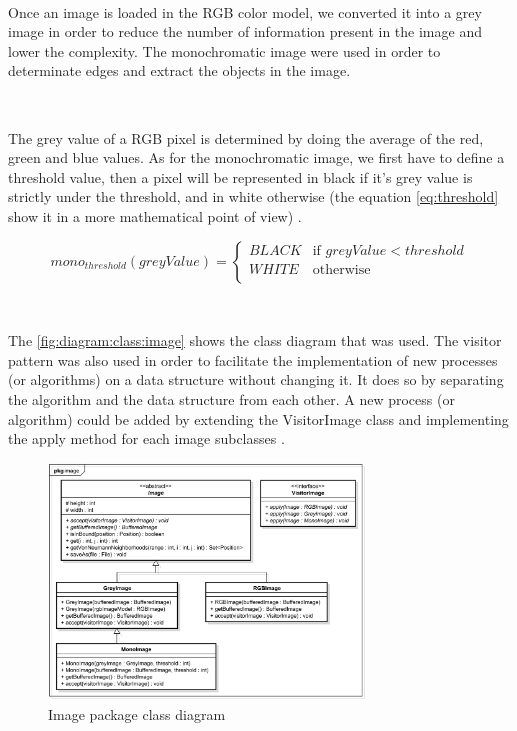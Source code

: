 ~~

Once an image is loaded in the RGB color model, we converted it into a grey image in order to reduce the number of information present in the image and lower the complexity. The monochromatic image were used in order to determinate edges and extract the objects in the image.

~~

The grey value of a RGB pixel is determined by doing the average of the red, green and blue values. As for the monochromatic image, we first have to define a 
threshold value, then a pixel will be represented in black if it's grey value is strictly under the threshold, and in white otherwise (the equation \ref{eq:threshold} show it in a more mathematical point of view) \cite{bib:image:Threshold}.

\begin{equation} \label{eq:threshold}
mono_{threshold}(greyValue) = 
	\begin{cases}
		BLACK & \text{if } greyValue < threshold \\
		WHITE & \text{otherwise} \\ 
	\end{cases}
\end{equation}


~~

The \vref{fig:diagram:class:image} shows the class diagram that was used. The visitor pattern was also used in order to facilitate the implementation of new processes (or algorithms) on a data structure without changing it. It does so by separating the algorithm and the data structure from each other. A new process (or algorithm) could be added by extending the VisitorImage class and implementing the apply method for each image subclasses \cite{bib:pattern:Visitor}. 


\begin{figure}[h]
	\centering 
	\includegraphics[width=0.75\textwidth]{images/diagrams/class_diagram_image}
	\caption{Image package class diagram}
	\label{fig:diagram:class:image}
\end{figure}



